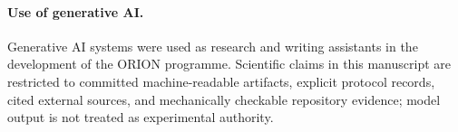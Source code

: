\documentclass[11pt]{article}
\begin{document}
\paragraph{Use of generative AI.} Generative AI systems were used as research and writing assistants in the development of the ORION programme. Scientific claims in this manuscript are restricted to committed machine-readable artifacts, explicit protocol records, cited external sources, and mechanically checkable repository evidence; model output is not treated as experimental authority.



\end{document}
